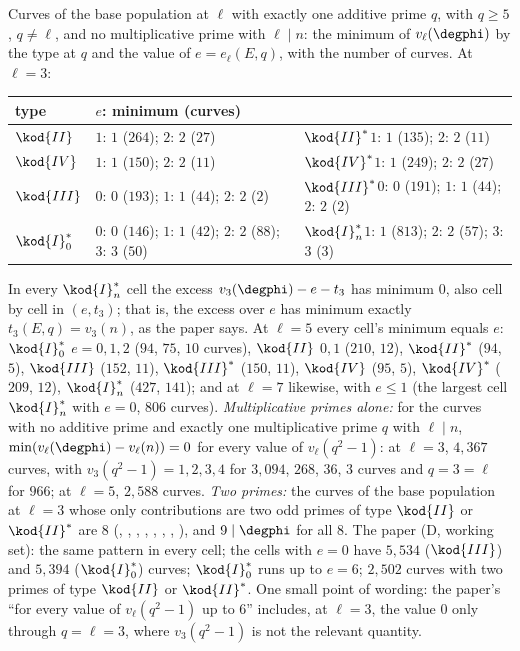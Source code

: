 \begin{sloppypar}
\begin{example}\label{ex:computation:repro-iso}
Curves of the base population at $\ell$ with exactly one additive prime $q$, with $q\ge5$, $q\ne\ell$, and no multiplicative prime with $\ell\mid n$: the minimum of
$v_\ell(\degphi)$ by the type at $q$ and the value of $e=e_\ell(E,q)$, with the number of curves. At $\ell=3$:
\begin{center}\footnotesize
\begin{tabular}{lll}
\toprule
type & $e$: minimum (curves) & \\
\midrule
$\kod{II}$ & $1$: $1$ ($264$); $2$: $2$ ($27$) & $\kod{II}^*$\quad $1$: $1$ ($135$); $2$: $2$ ($11$)\\
$\kod{IV}$ & $1$: $1$ ($150$); $2$: $2$ ($11$) & $\kod{IV}^*$\quad $1$: $1$ ($249$); $2$: $2$ ($27$)\\
$\kod{III}$ & $0$: $0$ ($193$); $1$: $1$ ($44$); $2$: $2$ ($2$) & $\kod{III}^*$\quad $0$: $0$ ($191$); $1$: $1$ ($44$); $2$: $2$ ($2$)\\
$\kod{I}_0^*$ & $0$: $0$ ($146$); $1$: $1$ ($42$); $2$: $2$ ($88$); $3$: $3$ ($50$) & $\kod{I}_n^*$\quad $1$: $1$ ($813$); $2$: $2$ ($57$); $3$: $3$ ($3$)\\
\bottomrule
\end{tabular}
\end{center}
In every $\kod{I}_n^*$ cell the excess $v_3(\degphi)-e-t_3$ has minimum $0$, also cell by cell in $(e,t_3)$; that is, the excess over $e$ has minimum exactly
$t_3(E,q)=v_3(n)$, as the paper says. At $\ell=5$ every cell's minimum equals $e$: $\kod{I}_0^*$ $e=0,1,2$ ($94$, $75$, $10$ curves), $\kod{II}$ $0,1$ ($210$, $12$), $\kod{II}^*$ ($94$,
$5$), $\kod{III}$ ($152$, $11$), $\kod{III}^*$ ($150$, $11$), $\kod{IV}$ ($95$, $5$), $\kod{IV}^*$ ($209$, $12$), $\kod{I}_n^*$ ($427$, $141$); and at $\ell=7$ likewise, with $e\le1$ (the largest
cell $\kod{I}_n^*$ with $e=0$, $806$ curves). \emph{Multiplicative primes alone:} for the curves with no additive prime and exactly one multiplicative prime $q$ with
$\ell\mid n$, $\min(v_\ell(\degphi)-v_\ell(n))=0$ for every value of $v_\ell(q^2-1)$: at $\ell=3$, $4{,}367$ curves, with $v_3(q^2-1)=1,2,3,4$ for $3{,}094$, $268$, $36$, $3$
curves and $q=3=\ell$ for $966$; at $\ell=5$, $2{,}588$ curves. \emph{Two primes:} the curves of the base population at $\ell=3$ whose only contributions are two odd
primes of type $\kod{II}$ or $\kod{II}^*$ are $8$ (, , , , , , , ), and
$9\mid\degphi$ for all $8$. The paper (D, working set): the same pattern in every cell; the cells with $e=0$ have $5{,}534$ ($\kod{III}$) and $5{,}394$ ($\kod{I}_0^*$)
curves; $\kod{I}_0^*$ runs up to $e=6$; $2{,}502$ curves with two primes of type $\kod{II}$ or $\kod{II}^*$. One small point of wording: the paper's ``for every value of
$v_\ell(q^2-1)$ up to $6$'' includes, at $\ell=3$, the value $0$ only through $q=\ell=3$, where $v_3(q^2-1)$ is not the relevant quantity.
\end{example}


\end{sloppypar}
